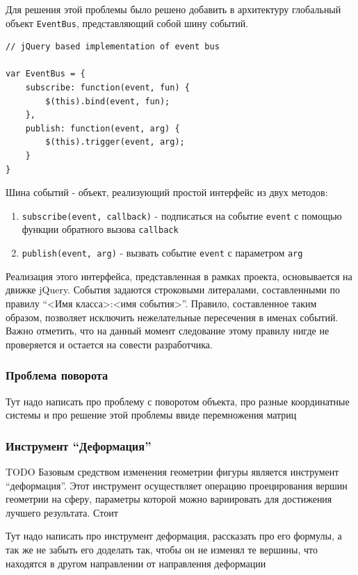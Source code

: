 \documentclass[12pt, a4paper]{article}
\begin{document}
Для решения этой проблемы было решено добавить в архитектуру глобальный объект
\texttt{EventBus}, представляющий собой шину событий.

\begin{lstlisting}
// jQuery based implementation of event bus

var EventBus = {
    subscribe: function(event, fun) {
        $(this).bind(event, fun);
    },
    publish: function(event, arg) {
        $(this).trigger(event, arg);
    }
}
\end{lstlisting}

Шина событий - объект, реализующий простой интерфейс из двух методов:
\begin{enumerate}
    \item \texttt{subscribe(event, callback)} - подписаться на событие
    \texttt{event} с помощью функции обратного вызова \texttt{callback}
    \item \texttt{publish(event, arg)} - вызвать событие
    \texttt{event} с параметром \texttt{arg}
\end{enumerate}

Реализация этого интерфейса, представленная в рамках проекта, основывается на
движке jQuery. События задаются строковыми литералами, составленными по правилу
``<Имя класса>:<имя события>''. Правило, составленное таким образом, позволяет
исключить нежелательные пересечения в именах событий. Важно отметить, что на
данный момент следование этому правилу нигде не проверяется и остается на
совести разработчика.

\subsubsection{Проблема поворота}
Тут надо написать про проблему с поворотом объекта, про разные
координатные системы и про решение этой проблемы ввиде перемножения
матриц
\subsubsection{Инструмент ``Деформация''}
TODO
Базовым средством изменения геометрии фигуры является инструмент ``деформация''.
Этот инструмент осуществляет операцию проецирования вершин геометрии на сферу,
параметры которой можно вариировать для достижения лучшего результата.
Стоит

Тут надо написать про инструмент деформация, рассказать про его формулы,
а так же не забыть его доделать так, чтобы он не изменял те вершины, что
находятся в другом направлении от направления деформации
\end{document}

